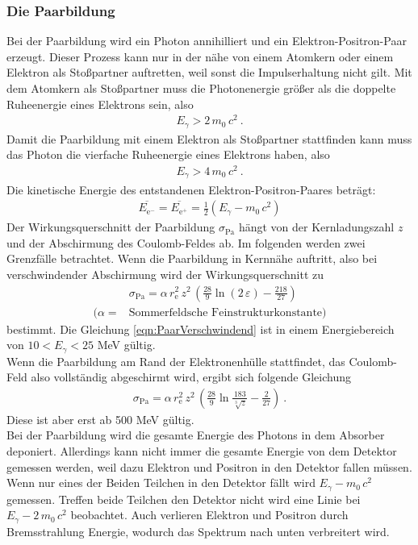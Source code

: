 \subsubsection{Die Paarbildung}
Bei der Paarbildung wird ein Photon annihilliert und ein Elektron-Positron-Paar erzeugt. Dieser Prozess kann nur in der nähe von einem Atomkern oder einem Elektron als Stoßpartner auftretten, weil sonst die Impulserhaltung nicht gilt. Mit dem Atomkern als Stoßpartner muss die Photonenergie größer als die doppelte Ruheenergie eines Elektrons sein, also
\begin{align*}
	E_{\gamma} > 2\,m_0\,c^2 \ .
\end{align*}
Damit die Paarbildung mit einem Elektron als Stoßpartner stattfinden kann muss das Photon die vierfache Ruheenergie eines Elektrons haben, also
\begin{align*}
	E_{\gamma} > 4\,m_0\,c^2 \ .
\end{align*}
Die kinetische Energie des entstandenen Elektron-Positron-Paares beträgt:
\begin{align}
	\overline{E_{\text{e}^-}} = \overline{E_{\text{e}^+}} = \frac{1}{2}(E_{\gamma} - m_0\,c^2)
\end{align}
Der Wirkungsquerschnitt der Paarbildung $\sigma_\text{Pa}$ hängt von der Kernladungszahl $z$ und der Abschirmung des Coulomb-Feldes ab. Im folgenden werden zwei Grenzfälle betrachtet. Wenn die Paarbildung in Kernnähe auftritt, also bei verschwindender Abschirmung wird der Wirkungsquerschnitt zu
\begin{align}
	&\sigma_\text{Pa} = \alpha\, r_\text{e}^2\, z^2\, \left(\frac{28}{9}\ln(2\,\varepsilon) - \frac{218}{27} \right) \\
	(\alpha = &\text{Sommerfeldsche Feinstrukturkonstante})
	\label{eqn:PaarVerschwindend}
\end{align}
bestimmt. Die Gleichung \eqref{eqn:PaarVerschwindend} ist in einem Energiebereich von $10 < E_\gamma < 25$ MeV gültig. \\
Wenn die Paarbildung am Rand der Elektronenhülle stattfindet, das Coulomb-Feld also vollständig abgeschirmt wird, ergibt sich folgende Gleichung
\begin{align}
	\sigma_\text{Pa} = \alpha\, r_\text{e}^2\, z^2\, \left(\frac{28}{9}\ln\frac{183}{\sqrt[3]{z}} - \frac{2}{27} \right) \ .
\end{align}
Diese ist aber erst ab 500 MeV gültig. \\
Bei der Paarbildung wird die gesamte Energie des Photons in dem Absorber deponiert. Allerdings kann nicht immer die gesamte Energie von dem Detektor gemessen werden, weil dazu Elektron und Positron in den Detektor fallen müssen. Wenn nur eines der Beiden Teilchen in den Detektor fällt wird $E_\gamma - m_0\,c^2$ gemessen. Treffen beide Teilchen den Detektor nicht wird eine Linie bei $E_\gamma - 2\,m_0\,c^2$ beobachtet. Auch verlieren Elektron und Positron durch Bremsstrahlung Energie, wodurch das Spektrum nach unten verbreitert wird.



